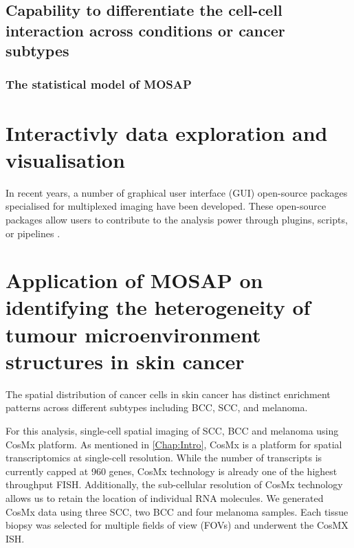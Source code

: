 \subsection{Capability to differentiate the cell-cell interaction across conditions or cancer subtypes}


\subsubsection{The statistical model of MOSAP}
\section{Interactivly data exploration and visualisation}
In recent years, a number of graphical user interface (GUI) open-source packages specialised for multiplexed imaging have been developed. These open-source packages allow users to contribute to the analysis power through plugins, scripts, or pipelines \cite{bankhead2017qupath,schneider2012nih}.  
\section{Application of MOSAP on identifying the heterogeneity of tumour microenvironment structures in skin cancer}

The spatial distribution of cancer cells in skin cancer has distinct enrichment patterns across different subtypes including BCC, SCC, and melanoma. 


For this analysis, single-cell spatial imaging of SCC, BCC and melanoma using CosMx platform. As mentioned in \ref{Chap:Intro}, CosMx is a platform for spatial transcriptomics at single-cell resolution. While the number of transcripts is currently capped at 960 genes, CosMx technology is already one of the highest throughput FISH. Additionally, the sub-cellular resolution of CosMx technology allows us to retain the location of individual RNA molecules. We generated CosMx data using three SCC, two BCC and four melanoma samples. Each tissue biopsy was selected for multiple fields of view (FOVs) and underwent the CosMX ISH.  

